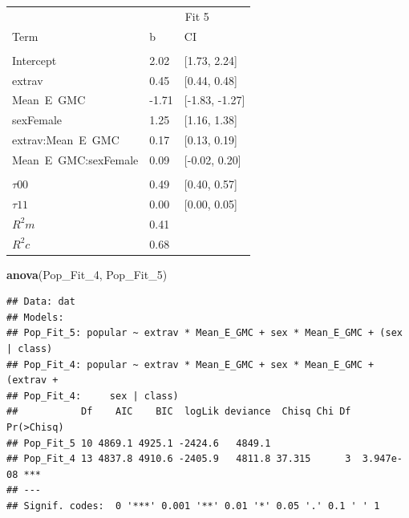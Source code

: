 \documentclass[]{article}
\newenvironment{Shaded}{\begin{snugshade}}{\end{snugshade}}
\newcommand{\KeywordTok}[1]{\textcolor[rgb]{0.13,0.29,0.53}{\textbf{#1}}}
\newcommand{\DecValTok}[1]{\textcolor[rgb]{0.00,0.00,0.81}{#1}}
\newcommand{\NormalTok}[1]{#1}
\begin{document}
\begin{tabular}{lll}
\toprule
\multicolumn{1}{c}{ } & \multicolumn{2}{c}{Fit 5} \\
\cmidrule(l{2pt}r{2pt}){2-3}
Term & b & CI\\
\midrule
\addlinespace[0.3em]
\multicolumn{3}{l}{\textbf{Fixed}}\\
\hspace{1em}Intercept & 2.02 & [1.73, 2.24]\\
\hspace{1em}extrav & 0.45 & [0.44, 0.48]\\
\hspace{1em}Mean\ E\ GMC & -1.71 & [-1.83, -1.27]\\
\hspace{1em}sexFemale & 1.25 & [1.16, 1.38]\\
\hspace{1em}extrav:Mean\ E\ GMC & 0.17 & [0.13, 0.19]\\
\hspace{1em}Mean\ E\ GMC:sexFemale & 0.09 & [-0.02, 0.20]\\
\addlinespace[0.3em]
\multicolumn{3}{l}{\textbf{Random}}\\
\hspace{1em}$\tau {00}$ & 0.49 & [0.40, 0.57]\\
\hspace{1em}$\tau {11}$ & 0.00 & [0.00, 0.05]\\
$R^2 m$ & 0.41 & \\
$R^2 c$ & 0.68 & \\
\bottomrule
\end{tabular}

\begin{Shaded}
\begin{Highlighting}[]
\KeywordTok{anova}\NormalTok{(Pop_Fit_}\DecValTok{4}\NormalTok{, Pop_Fit_}\DecValTok{5}\NormalTok{)}
\end{Highlighting}
\end{Shaded}

\begin{verbatim}
## Data: dat
## Models:
## Pop_Fit_5: popular ~ extrav * Mean_E_GMC + sex * Mean_E_GMC + (sex | class)
## Pop_Fit_4: popular ~ extrav * Mean_E_GMC + sex * Mean_E_GMC + (extrav + 
## Pop_Fit_4:     sex | class)
##           Df    AIC    BIC  logLik deviance  Chisq Chi Df Pr(>Chisq)    
## Pop_Fit_5 10 4869.1 4925.1 -2424.6   4849.1                             
## Pop_Fit_4 13 4837.8 4910.6 -2405.9   4811.8 37.315      3  3.947e-08 ***
## ---
## Signif. codes:  0 '***' 0.001 '**' 0.01 '*' 0.05 '.' 0.1 ' ' 1
\end{verbatim}
\end{document}
